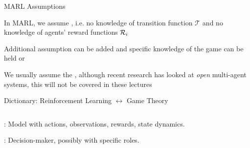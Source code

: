 \begin{frame}{MARL Assumptions}

\blist
    \item In MARL, we assume , i.e. no knowledge of transition function $\mathcal{T}$ and no knowledge of agents' reward functions $\mathcal{R}_i$
    \item Additional assumption can be added and specific knowledge of the game can be held or 
    \item We usually assume the , although recent research has looked at \textit{open} multi-agent systems, this will not be covered in these lectures 
\elist

\end{frame}

\begin{frame}{Dictionary: Reinforcement Learning \(\leftrightarrow\) Game Theory}
\centering

\begin{columns}[T]
    \begin{column}{0.5\textwidth}
        \vspace{5pt}
        \blist
            \item {}: Model with actions, observations, rewards, state dynamics.
            \item {}: Decision-maker, possibly with specific roles.
        \elist
    \end{column}



\end{columns}
\end{frame}
